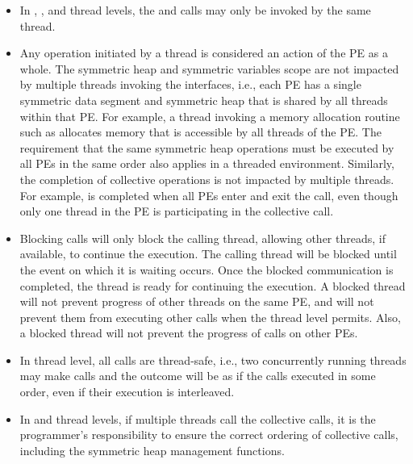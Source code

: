 \begin{itemize}
\item
In , , and 
 thread levels, the  and 
 calls may only be invoked by the same thread.

\item
Any \openshmem operation initiated by a thread is considered an action of the 
\ac{PE} as a whole. The symmetric heap and symmetric variables scope are not 
impacted by multiple threads invoking the \openshmem interfaces, i.e., 
each \ac{PE} has a single symmetric data segment and symmetric heap that is shared by
all threads within that \ac{PE}.  For example, a thread invoking a memory allocation
routine such as  allocates memory that is accessible by 
all threads of the \ac{PE}. The requirement that the same symmetric heap operations 
must be executed by all \acp{PE} in the same order also applies in a threaded
environment. Similarly, the completion of collective operations is not impacted 
by multiple threads. For example,  is completed when 
all \acp{PE} enter and exit the  call, even though 
only one thread in the \ac{PE} is participating in the collective call. 


\item Blocking \openshmem calls will only block the calling thread, allowing
other threads, if available, to continue the execution. The calling thread will 
be blocked until the event on which it is waiting occurs. Once the blocked communication is
completed, the thread is ready for continuing the execution. A blocked thread
will not prevent progress of other threads on the same \ac{PE}, and will not
prevent them from executing other \openshmem calls when the thread level permits. 
Also, a blocked thread will not prevent the progress of \openshmem calls on other \acp{PE}. 

\item In  thread level, all \openshmem calls are thread-safe, 
i.e., two concurrently running threads may make \openshmem calls and the outcome 
will be as if the calls executed in some order, even if their execution is interleaved.

\item In  and  thread levels, 
if multiple threads call the collective calls, it is the programmer's responsibility 
to ensure the correct ordering of collective calls, including the symmetric 
heap management functions.

\end{itemize} 
